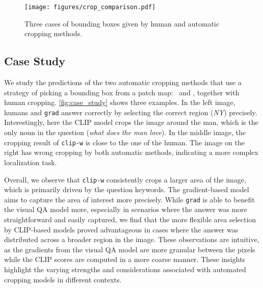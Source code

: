 \begin{figure}[!t]
    \centering
    \texttt{[image: figures/crop\_comparison.pdf]}
    \caption{Three cases of bounding boxes given by human and automatic cropping methods.}
    \label{fig:case_study}
\end{figure}



\subsection{Case Study}

We study the predictions of the two automatic cropping methods that use a strategy of picking a bounding box from a patch map: \grad~and \sac, together with human cropping. %
\autoref{fig:case_study} shows three examples. In the left image, humans and \texttt{grad} answer correctly by selecting the correct region (\textit{NY}) precisely. Interestingly, here the CLIP model crops the image around the man, which is the only noun in the question (\textit{what does the man love}). In the middle image, the cropping result of \texttt{clip-w} is close to the one of the human. The image on the right has wrong cropping by both automatic methods, indicating a more complex localization task.



Overall, we observe that \texttt{clip-w} consistently crops a larger area of the image, which is primarily driven by the question keywords. The gradient-based model aims to capture the area of interest more precisely. While \texttt{grad} is able to benefit the visual QA model more, especially in scenarios where the answer was more straightforward and easily captured, we find that the more flexible area selection by CLIP-based models proved advantageous in cases where the answer was distributed across a broader region in the image. These observations are intuitive, as the gradients from the visual QA model are more granular between the pixels while the CLIP scores are computed in a more coarse manner. These insights highlight the varying strengths and considerations associated with automated cropping models in different contexts.

